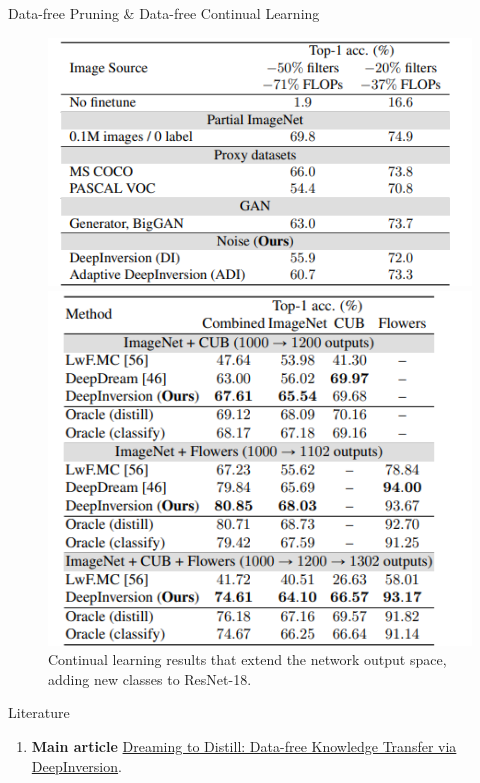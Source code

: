 \documentclass{beamer}
\begin{document}
\begin{frame}{Data-free Pruning \& Data-free Continual Learning} 
    \begin{figure}[!tbp]
  \centering
  \begin{minipage}[b]{0.47\textwidth}
    \includegraphics[width=\textwidth]{images/distill9.png}
    \caption{ImageNet ResNet-50 pruning comparison with prior work.}
  \end{minipage}
  \hfill
  \begin{minipage}[b]{0.5\textwidth}
    \includegraphics[width=\textwidth]{images/distill10.png}
    \caption{Continual learning results that extend the network output
space, adding new classes to ResNet-18.}
  \end{minipage}
\end{figure}
\end{frame}
 


\begin{frame}{Literature}
    \begin{enumerate}
        \item \textbf{Main article} \href{https://openaccess.thecvf.com/content_CVPR_2020/papers/Yin_Dreaming_to_Distill_Data-Free_Knowledge_Transfer_via_DeepInversion_CVPR_2020_paper.pdf}
        {Dreaming to Distill: Data-free Knowledge Transfer via DeepInversion}.
    \end{enumerate}
\end{frame}




\end{document}
